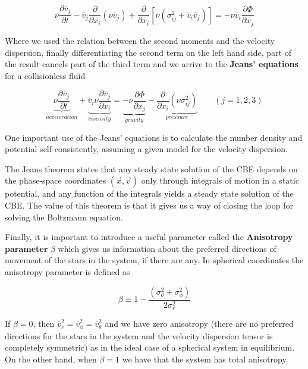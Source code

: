 \begin{equation}
\nu \frac{\partial \overline{v}_{j}}{\partial t}-\overline{v}_{j}\frac{\partial}{\partial x_{i}}(\nu \overline{v}_{j})+\frac{\partial}{\partial x_{i}}[\nu(\sigma_{ij}^{2}+\overline{v}_{i}\overline{v}_{j})]=-\nu \overline{v}_{i}\frac{\partial \Phi}{\partial x_{j}}
\end{equation}

Where we used the relation between the second moments and the velocity dispersion, finally differentiating the second term on the left hand side, part of the result cancels part of the third term and we arrive to the \textbf{Jeans' equations} for a collisionless fluid

\begin{equation}	
	\underbrace{\nu \frac{\partial \overline{v}_j}{\partial t}}_{acceleration} + \underbrace{\overline{v}_i\nu \frac{\partial\overline{v}_j}{\partial x_{i}}}_{viscosity} = \underbrace{-\nu \frac{\partial\Phi}{\partial x_{j}}}_{gravity} - \underbrace{\frac{\partial}{\partial x_{i}}(\nu \sigma_{ij}^{2})}_{pressure}\quad\quad (j=1,2,3)
\end{equation}

One important use of the Jeans' equations is to calculate the number density and potential self-consistently, assuming
a given model for the velocity dispersion.

The Jeans theorem states that any steady state solution of the CBE depends on the phase-space coordinates $(\vec{x},\vec{v})$ only through integrals of motion in a static potential, and any function of the integrals yields a steady state solution of the CBE. The value of this theorem is that it gives us a way of closing the loop for solving the Boltzmann equation. 

Finally, it is important to introduce a useful parameter called the \textbf{Anisotropy parameter} $\beta$ which gives us information about the preferred directions of movement of the stars in the system, if there are any. In spherical coordinates the anisotropy parameter is defined as

\begin{equation}
\beta \equiv 1-\frac{\left(\sigma_{\theta}^{2}+\sigma_{\phi}^{2}\right)}{2\sigma_{r}^{2}}
\end{equation}

If $\beta=0$, then $\overline{v}_{r}^{2}=\overline{v}_{\phi}^{2}=\overline{v}_{\theta}^{2}$ and we have zero anisotropy (there are no preferred directions for the stars in the system and the velocity dispersion tensor is completely symmetric) as in the ideal case of a spherical system in equilibrium. On the other hand, when $\beta=1$ we have that the system has total anisotropy.

